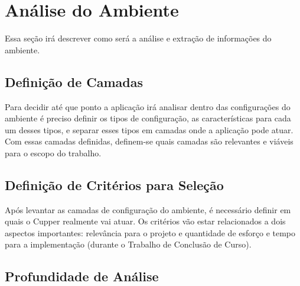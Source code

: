 \section{Análise do Ambiente}
Essa seção irá descrever como será a análise e extração de informações do ambiente. 


\subsection{Definição de Camadas}
Para decidir até que ponto a aplicação irá analisar dentro das configurações
do ambiente é preciso definir os tipos de configuração, as características para
cada um desses tipos, e separar esses tipos em camadas onde a aplicação pode atuar.
Com essas camadas definidas, definem-se quais camadas são relevantes e viáveis
para o escopo do trabalho.

\subsection{Definição de Critérios para Seleção}
Após levantar as camadas de configuração do ambiente, é necessário definir em
quais o Cupper realmente vai atuar. Os critérios vão estar relacionados a dois
aspectos importantes: relevância para o projeto e quantidade de esforço e tempo
para a implementação (durante o Trabalho de Conclusão de Curso). 

\subsection{Profundidade de Análise}

